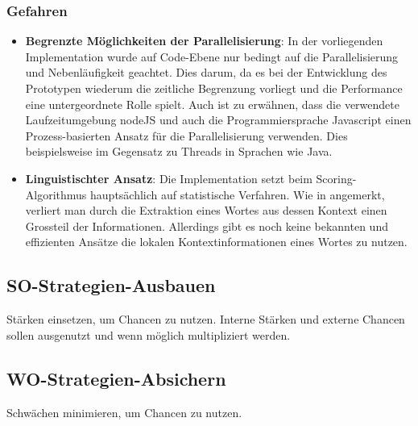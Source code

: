 \subsubsection{Gefahren}

\begin{itemize}
    \item \textbf{Begrenzte Möglichkeiten der Parallelisierung}: In der vorliegenden Implementation wurde auf Code-Ebene nur bedingt auf die Parallelisierung und Nebenläufigkeit geachtet. Dies darum, da es bei der Entwicklung des Prototypen wiederum die zeitliche Begrenzung vorliegt und die Performance eine untergeordnete Rolle spielt. Auch ist zu erwähnen, dass die verwendete Laufzeitumgebung nodeJS und auch die Programmiersprache Javascript einen Prozess-basierten Ansatz für die Parallelisierung verwenden. Dies beispielsweise im Gegensatz zu Threads in Sprachen wie Java.
    \item \textbf{Linguistischter Ansatz}: Die Implementation setzt beim Scoring-Algorithmus hauptsächlich auf statistische Verfahren. Wie in \cite[S.~1-2]{Zhang2006} angemerkt, verliert man durch die Extraktion eines Wortes aus dessen Kontext einen Grossteil der Informationen. Allerdings gibt es noch keine bekannten und effizienten Ansätze die lokalen Kontextinformationen eines Wortes zu nutzen.
\end{itemize}

\subsection{SO-Strategien-Ausbauen}
Stärken einsetzen, um Chancen zu nutzen. Interne Stärken und externe Chancen sollen ausgenutzt und wenn möglich multipliziert werden.


\subsection{WO-Strategien-Absichern}

Schwächen minimieren, um Chancen zu nutzen.

